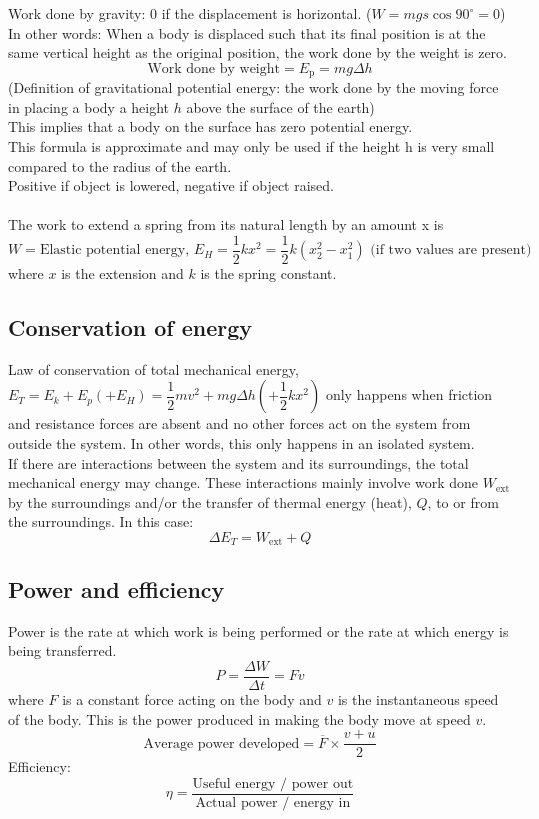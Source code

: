 \documentclass[a4paper,12pt]{article}
\begin{document}
Work done by gravity: 0 if the displacement is horizontal. ($W=mgs\cos 90^\circ=0$)\\
In other words: When a body is displaced such that its final position is at the same vertical height as the original position, the work done by the weight is zero.
\[\text{Work done by weight}=E_\text{p}=mg\Delta h\]
(Definition of gravitational potential energy: the work done by the moving force in placing a body a height $h$ above the surface of the earth)\\
This implies that a body on the surface has zero potential energy.\\
This formula is approximate and may only be used if the height h is very small compared to the radius of the earth.\\
Positive if object is lowered, negative if object raised.\\\\
The work to extend a spring from its natural length by an amount x is
\[W=\text{Elastic potential energy, } E_H=\dfrac{1}{2}kx^2=\dfrac{1}{2}k(x_2^2-x_1^2) \text{ (if two values are present)}\]
where $x$ is the extension and $k$ is the spring constant.
\subsection{Conservation of energy}
Law of conservation of total mechanical energy, $E_T=E_k+E_p(+E_H)=\dfrac{1}{2}mv^2+mg\Delta h\left(+\dfrac{1}{2}kx^2\right)$ only happens when friction and resistance forces are absent and no other forces act on the system from outside the system. In other words, this only happens in an isolated system.\\
If there are interactions between the system and its surroundings, the total mechanical energy may change. These interactions mainly involve work done $W_\text{ext}$ by the surroundings and/or the transfer of thermal energy (heat), $Q$, to or from the surroundings. In this case:
\[\Delta E_T=W_\text{ext} + Q\]
\subsection{Power and efficiency}
Power is the rate at which work is being performed or the rate at which energy is being transferred.
\[P=\dfrac{\Delta W}{\Delta t}=Fv\]
where $F$ is a constant force acting on the body and $v$ is the instantaneous speed of the body. This is the power produced in making the body move at speed $v$.
\[\text{Average power developed}=\overline{F}\times\dfrac{v+u}{2}\]
Efficiency:
\[\eta=\dfrac{\text{Useful energy / power out}}{\text{Actual power / energy in}}\]
\end{document}

